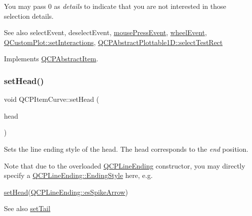 You may pass 0 as {\itshape details} to indicate that you are not interested in those selection details.

\begin{DoxySeeAlso}{See also}
select\+Event, deselect\+Event, \hyperlink{classQCPLayerable_af6567604818db90f4fd52822f8bc8376}{mouse\+Press\+Event}, \hyperlink{classQCPLayerable_a47dfd7b8fd99c08ca54e09c362b6f022}{wheel\+Event}, \hyperlink{classQCustomPlot_a5ee1e2f6ae27419deca53e75907c27e5}{Q\+Custom\+Plot\+::set\+Interactions}, \hyperlink{classQCPAbstractPlottable1D_a22377bf6e57ab7eedbc9e489250c6ded}{Q\+C\+P\+Abstract\+Plottable1\+D\+::select\+Test\+Rect} 
\end{DoxySeeAlso}


Implements \hyperlink{classQCPAbstractItem_ae41d0349d68bb802c49104afd100ba2a}{Q\+C\+P\+Abstract\+Item}.

\mbox{\label{classQCPItemCurve_a08a30d9cdd63995deea3d9e20430676f}} 
\subsubsection{\texorpdfstring{set\+Head()}{setHead()}}
{\footnotesize\ttfamily void Q\+C\+P\+Item\+Curve\+::set\+Head (\begin{DoxyParamCaption}\item[{const \hyperlink{classQCPLineEnding}{Q\+C\+P\+Line\+Ending} \&}]{head }\end{DoxyParamCaption})}

Sets the line ending style of the head. The head corresponds to the {\itshape end} position.

Note that due to the overloaded \hyperlink{classQCPLineEnding}{Q\+C\+P\+Line\+Ending} constructor, you may directly specify a \hyperlink{classQCPLineEnding_a5ef16e6876b4b74959c7261d8d4c2cd5}{Q\+C\+P\+Line\+Ending\+::\+Ending\+Style} here, e.\+g.
\begin{DoxyCode}
\hyperlink{classQCPItemCurve_a08a30d9cdd63995deea3d9e20430676f}{setHead}(\hyperlink{classQCPLineEnding_a5ef16e6876b4b74959c7261d8d4c2cd5ab9964d0d03f812d1e79de15edbeb2cbf}{QCPLineEnding::esSpikeArrow}) 
\end{DoxyCode}


\begin{DoxySeeAlso}{See also}
\hyperlink{classQCPItemCurve_ac3488d8b1a6489c845dc5bff3ef71124}{set\+Tail} 
\end{DoxySeeAlso}
\mbox{\label{classQCPItemCurve_a034be908440aec785c34b92843461221}} 

